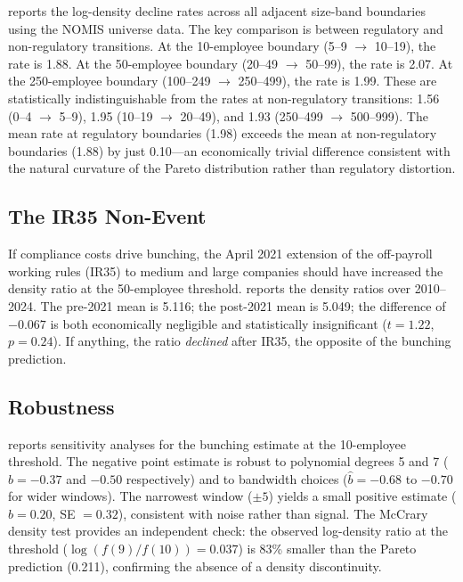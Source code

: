 \documentclass[12pt]{article}
\begin{document}
 reports the log-density decline rates across all adjacent size-band boundaries using the NOMIS universe data. The key comparison is between regulatory and non-regulatory transitions. At the 10-employee boundary (5--9 $\to$ 10--19), the rate is 1.88. At the 50-employee boundary (20--49 $\to$ 50--99), the rate is 2.07. At the 250-employee boundary (100--249 $\to$ 250--499), the rate is 1.99. These are statistically indistinguishable from the rates at non-regulatory transitions: 1.56 (0--4 $\to$ 5--9), 1.95 (10--19 $\to$ 20--49), and 1.93 (250--499 $\to$ 500--999). The mean rate at regulatory boundaries (1.98) exceeds the mean at non-regulatory boundaries (1.88) by just 0.10---an economically trivial difference consistent with the natural curvature of the Pareto distribution rather than regulatory distortion.



\subsection{The IR35 Non-Event}

If compliance costs drive bunching, the April 2021 extension of the off-payroll working rules (IR35) to medium and large companies should have increased the density ratio at the 50-employee threshold.  reports the density ratios over 2010--2024. The pre-2021 mean is 5.116; the post-2021 mean is 5.049; the difference of $-0.067$ is both economically negligible and statistically insignificant ($t = 1.22$, $p = 0.24$). If anything, the ratio \textit{declined} after IR35, the opposite of the bunching prediction.



\subsection{Robustness}

 reports sensitivity analyses for the bunching estimate at the 10-employee threshold. The negative point estimate is robust to polynomial degrees 5 and 7 ($\hat{b} = -0.37$ and $-0.50$ respectively) and to bandwidth choices ($\hat{b} = -0.68$ to $-0.70$ for wider windows). The narrowest window ($\pm 5$) yields a small positive estimate ($\hat{b} = 0.20$, SE $= 0.32$), consistent with noise rather than signal. The McCrary density test provides an independent check: the observed log-density ratio at the threshold ($\log(f(9)/f(10)) = 0.037$) is 83\% smaller than the Pareto prediction (0.211), confirming the absence of a density discontinuity.
\end{document}
